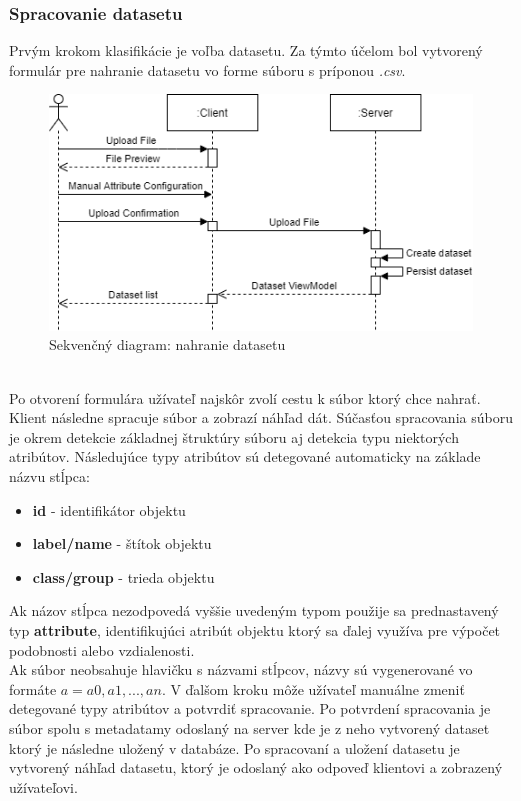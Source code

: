 \documentclass[slovak,master,dept460,male,cpp,cpdeclaration]{diploma}
\begin{document}
\subsubsection{Spracovanie datasetu}
Prvým krokom klasifikácie je voľba datasetu. Za týmto účelom bol vytvorený formulár pre nahranie datasetu vo forme súboru s príponou \textit{.csv}.
\begin{figure}[H]
\includegraphics[width=\textwidth]{uploadDataset.png}
\caption{Sekvenčný diagram: nahranie datasetu}
\end{figure} \\
Po otvorení formulára užívateľ najskôr zvolí cestu k súbor ktorý chce nahrať. Klient následne spracuje súbor a zobrazí náhľad dát. Súčasťou spracovania súboru je okrem detekcie základnej štruktúry súboru aj detekcia typu niektorých atribútov. Následujúce typy atribútov sú detegované automaticky na základe názvu stĺpca:
\begin{itemize}
\item \textbf{id} - identifikátor objektu
\item \textbf{label/name} - štítok objektu
\item \textbf{class/group} - trieda objektu
\end{itemize}
Ak názov stĺpca nezodpovedá vyššie uvedeným  typom použije sa prednastavený typ \textbf{attribute}, identifikujúci atribút objektu ktorý sa ďalej využíva pre výpočet podobnosti alebo vzdialenosti. \\
Ak súbor neobsahuje hlavičku s názvami stĺpcov, názvy sú vygenerované vo formáte $a = {a0, a1, ..., an}$.
V ďalšom kroku môže užívateľ manuálne zmeniť detegované typy atribútov a potvrdiť spracovanie. Po potvrdení spracovania je súbor spolu s metadatamy odoslaný na server kde je z neho vytvorený dataset ktorý je následne uložený v databáze.  Po spracovaní a uložení datasetu je vytvorený náhľad datasetu, ktorý je odoslaný ako odpoveď klientovi a zobrazený užívateľovi.
\end{document}
